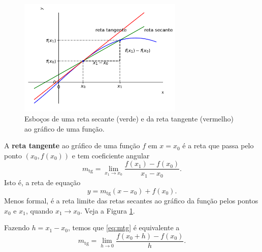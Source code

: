 \begin{figure}[H]
  \centering
  \includegraphics[width=0.7\textwidth]{./cap_deriv/dados/fig_retsectg/fig_retsectg}
  \caption{Esboços de uma reta secante (verde) e da reta tangente (vermelho) ao gráfico de uma função.}
  \label{fig:retsectg}
\end{figure}

A {\bf reta tangente} ao gráfico de uma função $f$ em $x=x_0$ é a reta que passa pelo ponto $(x_0, f(x_0))$ e tem coeficiente angular
\begin{equation}\label{eq:mtg}
  m_{\text{tg}} = \lim_{x_1\to x_0} \frac{f(x_1)-f(x_0)}{x_1-x_0}.
\end{equation}
Isto é, a reta de equação
\begin{equation}
  y = m_{\text{tg}}(x-x_0)+f(x_0).
\end{equation}
Menos formal, é a reta limite das retas secantes ao gráfico da função pelos pontos $x_0$ e $x_1$, quando $x_1\to x_0$. Veja a Figura \ref{fig:retsectg}.

\begin{obs}
  Fazendo $h = x_1-x_0$, temos que \eqref{eq:mtg} é equivalente a
  \begin{equation}
    m_{\text{tg}} = \lim_{h\to 0} \frac{f(x_0+h)-f(x_0)}{h}.
  \end{equation}
\end{obs}

